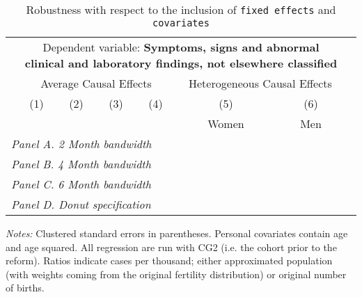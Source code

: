  \begin{table}[H] \begin{threeparttable} \centering \caption{Robustness with respect to the inclusion of \texttt{fixed effects} and \texttt{covariates}} {\def\sym#1{\ifmmode^{#1}\else\(^{#1}\)\fi} \begin{tabular}{l*{7}{c}} \toprule & \multicolumn{6}{c}{Dependent variable: \textbf{Symptoms, signs and abnormal clinical and laboratory findings, not elsewhere classified}} \\ \cmidrule(lr){2-7}
            &\multicolumn{4}{c}{Average Causal Effects}         &\multicolumn{2}{c}{Heterogeneous Causal Effects}\\\cmidrule(lr){2-5}\cmidrule(lr){6-7}
            &\multicolumn{1}{c}{(1)}&\multicolumn{1}{c}{(2)}&\multicolumn{1}{c}{(3)}&\multicolumn{1}{c}{(4)}&\multicolumn{1}{c}{(5)}&\multicolumn{1}{c}{(6)}\\
            &\multicolumn{1}{c}{}&\multicolumn{1}{c}{}&\multicolumn{1}{c}{}&\multicolumn{1}{c}{}&\multicolumn{1}{c}{Women}&\multicolumn{1}{c}{Men}\\
\midrule
 \multicolumn{7}{l}{\emph{Panel A. 2 Month bandwidth}} \\    \midrule\multicolumn{7}{l}{\emph{Panel B. 4 Month bandwidth}} \\    \midrule\multicolumn{7}{l}{\emph{Panel C. 6 Month bandwidth}} \\    \midrule\multicolumn{7}{l}{\emph{Panel D. Donut specification}} \\    \midrule  
\bottomrule \end{tabular} } \begin{tablenotes} \item \scriptsize \emph{Notes:} Clustered standard errors in parentheses. Personal covariates contain age and age squared. All regression are run with CG2 (i.e. the cohort prior to the reform). Ratios indicate cases per thousand; either approximated population (with weights coming from the original fertility distribution) or original number of births. \end{tablenotes} \end{threeparttable} \end{table} 
